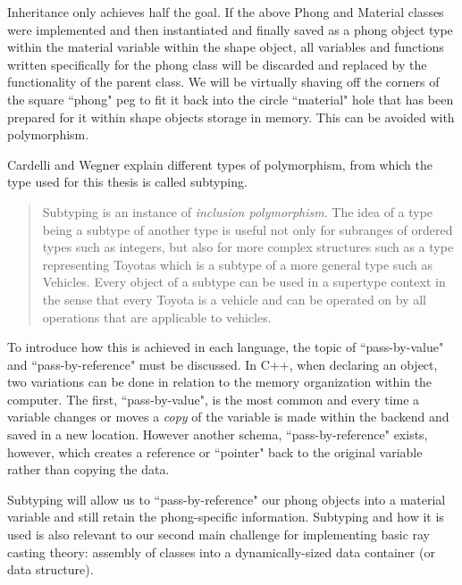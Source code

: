 Inheritance only achieves half the goal. If the above Phong and Material classes were implemented and then instantiated and finally saved as a phong object type within the material variable within the shape object, all variables and functions written specifically for the phong class will be discarded and replaced by the functionality of the parent class.  We will be virtually shaving off the corners of the square ``phong" peg to fit it back into the circle ``material" hole that has been prepared for it within shape objects storage in memory.  This can be avoided with polymorphism.

Cardelli and Wegner explain different types of polymorphism, from which the type used for this thesis is called subtyping.
\begin{quote}
Subtyping is an instance of \textit{inclusion polymorphism}. The idea of a type being a subtype of another type is useful not only for subranges of ordered types such as integers, but also for more complex structures
such as a type representing Toyotas which is a subtype of a more general type such as Vehicles. Every object of a subtype can be used in a supertype context in the sense that every Toyota is a vehicle and can be
operated on by all operations that are applicable to vehicles. \cite{cardelli1985understanding}
\end{quote}
To introduce how this is achieved in each language, the topic of ``pass-by-value" and ``pass-by-reference" must be discussed.  In C++, when declaring an object, two variations can be done in relation to the memory organization within the computer.  The first, ``pass-by-value", is the most common and every time a variable changes or moves a \textit{copy} of the variable is made within the backend and saved in a new location.  However another schema, ``pass-by-reference" exists, however, which creates a reference or ``pointer" back to the original variable rather than copying the data.

Subtyping will allow us to ``pass-by-reference" our phong objects into a material variable and still retain the phong-specific information.  Subtyping and how it is used is also relevant to our second main challenge for implementing basic ray casting theory: assembly of classes into a dynamically-sized data container (or data structure).

